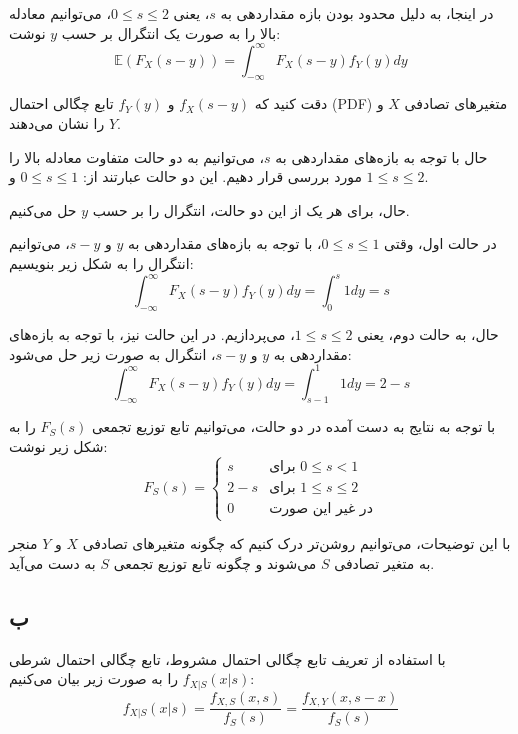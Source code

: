 در اینجا، به دلیل محدود بودن بازه مقداردهی به $s$، یعنی $0 \le s \le 2$، می‌توانیم معادله بالا را به صورت یک انتگرال بر حسب $y$ نوشت:
\begin{equation*}
	\mathbb{E}(F_X(s - y)) = \int_{-\infty}^\infty F_X(s - y)f_Y(y) dy
\end{equation*}

دقت کنید که $f_X(s-y)$ و $f_Y(y)$ تابع چگالی احتمال (PDF) متغیرهای تصادفی $X$ و $Y$ را نشان می‌دهند.

حال با توجه به بازه‌های مقداردهی به $s$، می‌توانیم به دو حالت متفاوت معادله بالا را مورد بررسی قرار دهیم. این دو حالت عبارتند از: $0 \le s \le 1$ و $1 \le s \le 2$.

حال، برای هر یک از این دو حالت، انتگرال را بر حسب $y$ حل می‌کنیم.

در حالت اول، وقتی $0 \le s \le 1$، با توجه به بازه‌های مقداردهی به $y$ و $s - y$، می‌توانیم انتگرال را به شکل زیر بنویسیم:
\begin{equation*}
	\int_{-\infty}^\infty F_X(s - y)f_Y(y) dy = \int_0^s 1 dy = s
\end{equation*}

حال، به حالت دوم، یعنی $1 \le s \le 2$، می‌پردازیم. در این حالت نیز، با توجه به بازه‌های مقداردهی به $y$ و $s - y$، انتگرال به صورت زیر حل می‌شود:
\begin{equation*}
	\int_{-\infty}^\infty F_X(s - y)f_Y(y) dy = \int_{s - 1}^1 1 dy = 2 - s
\end{equation*}

با توجه به نتایج به دست آمده در دو حالت، می‌توانیم تابع توزیع تجمعی $F_S(s)$ را به شکل زیر نوشت:
\begin{equation*}
	F_S(s) =
	\begin{cases}
		s & \text{برای } 0 \le s < 1 \\
		2 - s & \text{برای } 1 \le s \le 2 \\
		0 & \text{در غیر این صورت}
	\end{cases}
\end{equation*}

با این توضیحات، می‌توانیم روشن‌تر درک کنیم که چگونه متغیرهای تصادفی $X$ و $Y$ منجر به متغیر تصادفی $S$ می‌شوند و چگونه تابع توزیع تجمعی $S$ به دست می‌آید.

\subsection*{ب}

با استفاده از تعریف تابع چگالی احتمال مشروط، تابع چگالی احتمال شرطی 
$f_{X|S}(x | s)$
را به صورت زیر بیان می‌کنیم:
\begin{equation*}
	f_{X|S}(x | s) = \frac{f_{X,S}(x, s)}{f_S(s)} = \frac{f_{X,Y}(x, s - x)}{f_S(s)}
\end{equation*}

